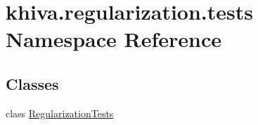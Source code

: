 \hypertarget{namespacekhiva_1_1regularization_1_1tests}{}\section{khiva.\+regularization.\+tests Namespace Reference}
\label{namespacekhiva_1_1regularization_1_1tests}
\subsection*{Classes}
\begin{DoxyCompactItemize}
\item 
class \mbox{\hyperlink{classkhiva_1_1regularization_1_1tests_1_1_regularization_tests}{Regularization\+Tests}}
\end{DoxyCompactItemize}
